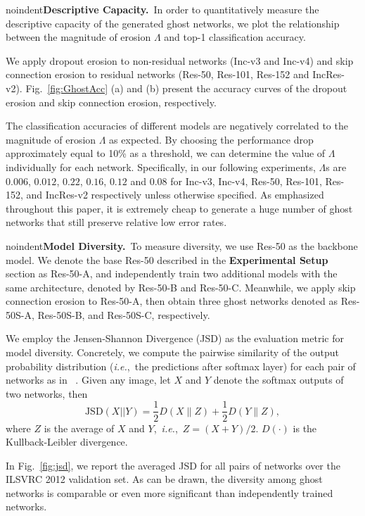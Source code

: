 \documentclass[letterpaper]{article} %
\newcommand{\citet}[1]{\citeauthor{#1} \shortcite{#1}}
\def\ie{\emph{i.e.}}
\begin{document}
noindent\textbf{Descriptive Capacity.}~In order to quantitatively measure the descriptive capacity of the generated ghost networks, we plot the relationship between the magnitude of erosion $\Lambda$ and top-1 classification accuracy.%

We apply dropout erosion to non-residual networks (Inc-v3 and Inc-v4) and skip connection erosion to residual networks (Res-50, Res-101, Res-152 and IncRes-v2). Fig.~\ref{fig:GhostAcc} (a) and (b) present the accuracy curves of the dropout erosion and skip connection erosion, respectively.

The classification accuracies of different models are negatively correlated to the magnitude of erosion $\Lambda$ as expected. By choosing the performance drop approximately equal to 10\% as a threshold, we can determine the value of $\Lambda$ individually for each network. Specifically, in our following experiments, $\Lambda$s are $0.006$, $0.012$, $0.22$, $0.16$, $0.12$ and $0.08$ for Inc-v3, Inc-v4, Res-50, Res-101, Res-152, and IncRes-v2 respectively unless otherwise specified. As emphasized throughout this paper, it is extremely cheap to generate a huge number of ghost networks that still preserve relative low error rates.



noindent\textbf{Model Diversity.}~To measure diversity, we use Res-50 as the backbone model. We denote the base Res-50 described in the \textbf{Experimental Setup} section as Res-50-A, and independently train two additional models with the same architecture, denoted by Res-50-B and Res-50-C. Meanwhile, we apply skip connection erosion to Res-50-A, then obtain three ghost networks denoted as Res-50S-A, Res-50S-B, and Res-50S-C, respectively.%

We employ the Jensen-Shannon Divergence (JSD) as the evaluation metric for model diversity. Concretely, we compute the pairwise similarity of the output probability distribution (\ie,~the predictions after softmax layer) for each pair of networks as in~\citet{huang2017snapshot}. Given any image, let $X$ and $Y$ denote the softmax outputs of two networks, then
\begin{equation}
\text{JSD}(X||Y)=\frac{1}{2}D(X\|Z)+\frac{1}{2}D(Y\|Z),
\end{equation}
where $Z$ is the average of $X$ and $Y$,~\ie,~$Z=(X+Y)/2$. $D(\cdot)$ is the Kullback-Leibler divergence.

In Fig.~\ref{fig:jsd}, we report the averaged JSD for all pairs of networks over the ILSVRC 2012 validation set. As can be drawn, the diversity among ghost networks is comparable or even more significant than independently trained networks.
\end{document}
